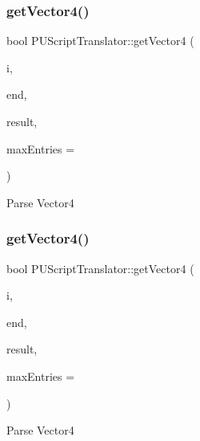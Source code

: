 \subsubsection{\texorpdfstring{get\+Vector4()}{getVector4()}\hspace{0.1cm}{\footnotesize\ttfamily [1/2]}}
{\footnotesize\ttfamily bool P\+U\+Script\+Translator\+::get\+Vector4 (\begin{DoxyParamCaption}\item[{P\+U\+Abstract\+Node\+List\+::const\+\_\+iterator}]{i,  }\item[{P\+U\+Abstract\+Node\+List\+::const\+\_\+iterator}]{end,  }\item[{\hyperlink{classVec4}{Vec4} $\ast$}]{result,  }\item[{int}]{max\+Entries = {} }\end{DoxyParamCaption})}

Parse Vector4 \mbox{\label{classPUScriptTranslator_a322d97ac1f6308ea0dda66b5b1c8b793}} 
\subsubsection{\texorpdfstring{get\+Vector4()}{getVector4()}\hspace{0.1cm}{\footnotesize\ttfamily [2/2]}}
{\footnotesize\ttfamily bool P\+U\+Script\+Translator\+::get\+Vector4 (\begin{DoxyParamCaption}\item[{P\+U\+Abstract\+Node\+List\+::const\+\_\+iterator}]{i,  }\item[{P\+U\+Abstract\+Node\+List\+::const\+\_\+iterator}]{end,  }\item[{\hyperlink{classVec4}{Vec4} $\ast$}]{result,  }\item[{int}]{max\+Entries = {} }\end{DoxyParamCaption})}

Parse Vector4 \mbox{\label{classPUScriptTranslator_ab2fc7f172c43c3d64bc05d86ddc1bcb9}} 
